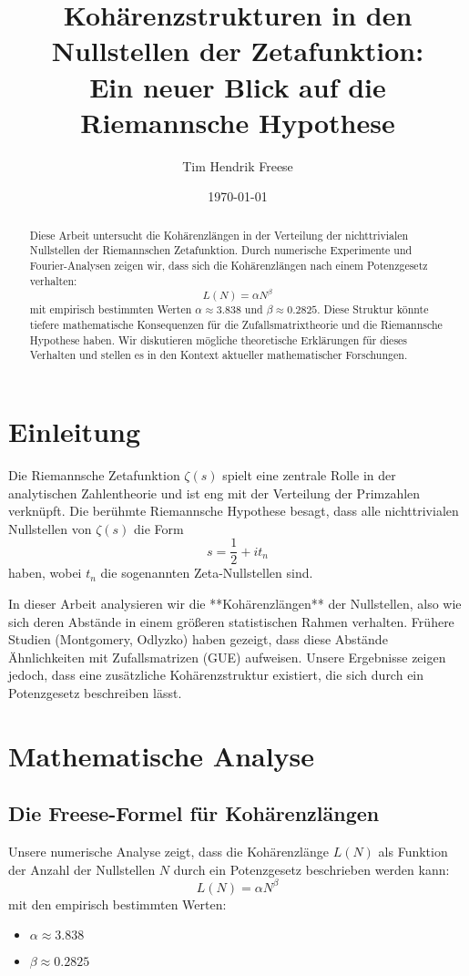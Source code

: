 \documentclass[a4paper,12pt]{article}
\title{Kohärenzstrukturen in den Nullstellen der Zetafunktion: \\
Ein neuer Blick auf die Riemannsche Hypothese}
\author{Tim Hendrik Freese}
\date{\today}
\begin{document}
\maketitle

\begin{abstract}
Diese Arbeit untersucht die Kohärenzlängen in der Verteilung der nichttrivialen Nullstellen der Riemannschen Zetafunktion. Durch numerische Experimente und Fourier-Analysen zeigen wir, dass sich die Kohärenzlängen nach einem Potenzgesetz verhalten:
\[
L(N) = \alpha N^\beta
\]
mit empirisch bestimmten Werten \(\alpha \approx 3.838\) und \(\beta \approx 0.2825\). Diese Struktur könnte tiefere mathematische Konsequenzen für die Zufallsmatrixtheorie und die Riemannsche Hypothese haben. Wir diskutieren mögliche theoretische Erklärungen für dieses Verhalten und stellen es in den Kontext aktueller mathematischer Forschungen.
\end{abstract}

\section{Einleitung}
Die Riemannsche Zetafunktion \(\zeta(s)\) spielt eine zentrale Rolle in der analytischen Zahlentheorie und ist eng mit der Verteilung der Primzahlen verknüpft. Die berühmte Riemannsche Hypothese besagt, dass alle nichttrivialen Nullstellen von \(\zeta(s)\) die Form
\[
s = \frac{1}{2} + i t_n
\]
haben, wobei \(t_n\) die sogenannten Zeta-Nullstellen sind.  

In dieser Arbeit analysieren wir die **Kohärenzlängen** der Nullstellen, also wie sich deren Abstände in einem größeren statistischen Rahmen verhalten. Frühere Studien (Montgomery, Odlyzko) haben gezeigt, dass diese Abstände Ähnlichkeiten mit Zufallsmatrizen (GUE) aufweisen. Unsere Ergebnisse zeigen jedoch, dass eine zusätzliche Kohärenzstruktur existiert, die sich durch ein Potenzgesetz beschreiben lässt.

\section{Mathematische Analyse}
\subsection{Die Freese-Formel für Kohärenzlängen}
Unsere numerische Analyse zeigt, dass die Kohärenzlänge \( L(N) \) als Funktion der Anzahl der Nullstellen \( N \) durch ein Potenzgesetz beschrieben werden kann:
\[
L(N) = \alpha N^\beta
\]
mit den empirisch bestimmten Werten:
\begin{itemize}
    \item \(\alpha \approx 3.838\)
    \item \(\beta \approx 0.2825\)
\end{itemize}
\end{document}

